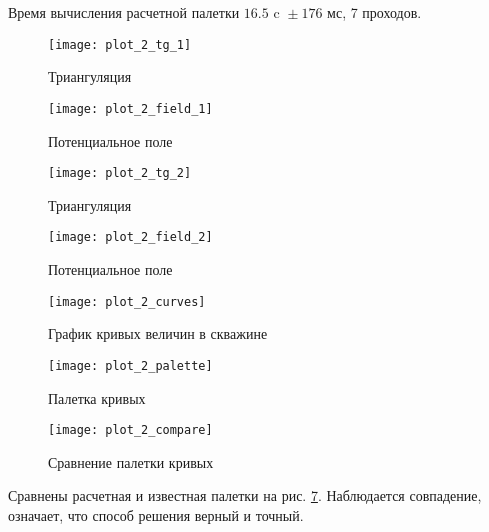 Время вычисления расчетной палетки ${16.5 \text{ c } \pm 176 \text{ мс}}$, 7 проходов.

\begin{figure}[H]
\centering
\texttt{[image: plot\_2\_tg\_1]}
\caption{Триангуляция}
\label{fig:mesh_2_1}
\end{figure}

\begin{figure}[H]
\centering
\texttt{[image: plot\_2\_field\_1]}
\caption{Потенциальное поле}
\label{fig:field_2_1}
\end{figure}

\begin{figure}[H]
\texttt{[image: plot\_2\_tg\_2]}
\caption{Триангуляция}
\label{fig:mesh_2_2}
\end{figure}

\begin{figure}[H]
\texttt{[image: plot\_2\_field\_2]}
\caption{Потенциальное поле}
\label{fig:field_2_2}
\end{figure}

\begin{figure}[H]
\texttt{[image: plot\_2\_curves]}
\caption{График кривых величин в скважине}
\label{fig:curves_2}
\end{figure}

\begin{figure}[H]
\texttt{[image: plot\_2\_palette]}
\caption{Палетка кривых}
\label{fig:palette_2}
\end{figure}

\begin{figure}[H]
\texttt{[image: plot\_2\_compare]}
\caption{Сравнение палетки кривых}
\label{fig:compare_2}
\end{figure}

Сравнены расчетная и известная палетки на рис. \ref{fig:compare_2}. Наблюдается совпадение, означает, что способ решения верный и точный.

\clearpage
